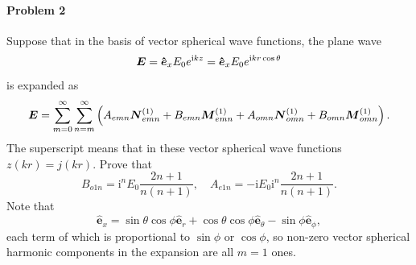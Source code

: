 \documentclass[hyperref, a4paper]{article}
\begin{document}
\paragraph{}

\paragraph{Problem 2} Suppose that in the basis of vector spherical wave functions, the plane wave 
\begin{equation}
    \boldsymbol{E}=\vu*{\boldsymbol{e}}_{x} E_{0} e^{\mathrm{i} k z}=\vu*{\boldsymbol{e}}_{x} E_{0} e^{\mathrm{i} k r \cos \theta}
    \label{eq:prob-2-4}
\end{equation}
is expanded as 
\begin{equation}
    \vb*{E} = \sum_{m = 0}^\infty \sum_{n = m}^\infty \left( A_{emn} \vb*{N}_{emn}^{(1)} + B_{emn} \vb*{M}_{emn}^{(1)} + A_{omn} \vb*{N}_{omn}^{(1)} + B_{omn} \vb*{M}_{omn}^{(1)} \right).
    \label{eq:prob-2-3}
\end{equation}
The superscript means that in these vector spherical wave functions $z(kr) = j(kr)$.
Prove that 
\begin{equation}
    B_{o 1 n}=\mathrm{i}^{n} E_{0} \frac{2 n+1}{n(n+1)}, \quad A_{e 1 n}=-\mathrm{i} E_{0} \mathrm{i}^{n} \frac{2 n+1}{n(n+1)}.
    \label{eq:prob-2-1}
\end{equation}
Note that 
\begin{equation}
    \hat{\boldsymbol{e}}_{x}=\sin \theta \cos \phi \hat{\boldsymbol{e}}_{r}+\cos \theta \cos \phi \hat{\boldsymbol{e}}_{\theta}-\sin \phi \hat{\boldsymbol{e}}_{\phi},
    \label{eq:prob-2-2}
\end{equation}
each term of which is proportional to $\sin\phi$ or $\cos\phi$, so non-zero vector spherical harmonic components in the expansion are all $m=1$ ones.
\end{document}
